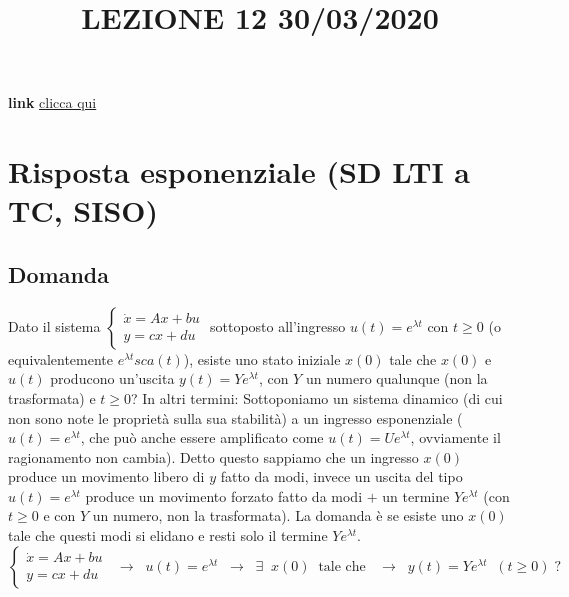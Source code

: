 \newpage
\title{LEZIONE 12 30/03/2020}\newline
\textbf{link} \href{https://web.microsoftstream.com/video/05bd4cd5-c99f-4a6c-9334-733e9a60083a?list=user&userId=faa91214-a6f5-40d7-8875-253fd49b8ce1}{clicca qui}
\section{Risposta esponenziale (SD LTI a TC, SISO)}
\subsection{Domanda}
Dato il sistema $\begin{cases}
    \dot{x} = Ax +bu\\ y = cx +du
\end{cases}$ sottoposto all'ingresso $u(t) = e^{\lambda t}$ con $t\geq 0$ (o equivalentemente $e^{\lambda t} sca(t)$), esiste uno stato iniziale $x(0)$ tale che $x(0)$ e $u(t)$ producono un'uscita $y(t)= Y e^{\lambda t}$, con $Y$ un numero qualunque (non la trasformata) e $t \geq 0$?\newline
\newline
In altri termini:\newline
Sottoponiamo un sistema dinamico (di cui non sono note le proprietà sulla sua stabilità) a un ingresso esponenziale ($u(t) = e^{\lambda t}$, che può anche essere amplificato come $u(t) = U e^{\lambda t}$, ovviamente il ragionamento non cambia). Detto questo sappiamo che un ingresso $x(0)$ produce un movimento libero di $y$ fatto da modi, invece un uscita del tipo $u(t) = e^{\lambda t}$ produce un movimento forzato fatto da modi $+$ un termine $Ye^{\lambda t}$ (con $t \geq 0$ e con $Y$ un numero, non la trasformata). La domanda è se esiste uno $x(0)$ tale che questi modi si elidano e resti solo il termine $Ye^{\lambda t}$.
\[
    \begin{cases}
        \dot{x} = Ax +bu\\ 
        y = cx +du
    \end{cases} \;\; \longrightarrow \;\; u(t) = e^{\lambda t} \;\; \longrightarrow \;\; \exists \;\;x(0) \;\;\text{tale che } \;\; \longrightarrow \;\; y(t) = Y e^{\lambda t} \;\;(t\geq 0) \;?
\]
